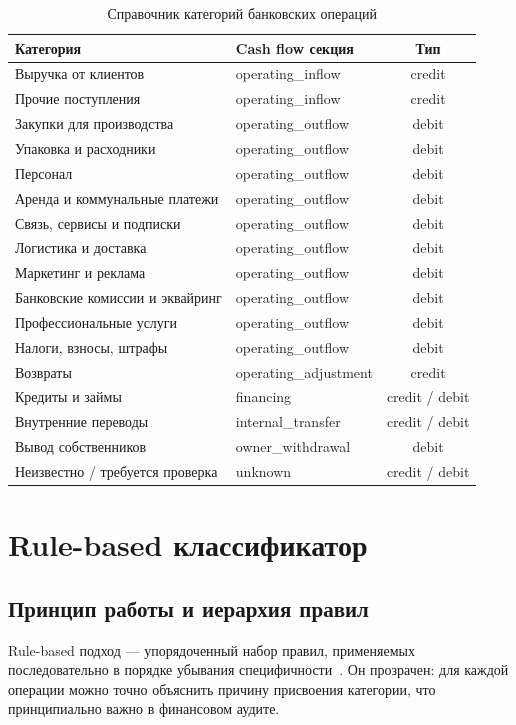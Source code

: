\begin{table}[H]
\centering
\caption{Справочник категорий банковских операций}
\label{tab:categories}
\begin{tabular}{llc}
\toprule
\textbf{Категория} & \textbf{Cash flow секция} & \textbf{Тип} \\
\midrule
Выручка от клиентов & operating\_inflow & credit \\
Прочие поступления & operating\_inflow & credit \\
Закупки для производства & operating\_outflow & debit \\
Упаковка и расходники & operating\_outflow & debit \\
Персонал & operating\_outflow & debit \\
Аренда и коммунальные платежи & operating\_outflow & debit \\
Связь, сервисы и подписки & operating\_outflow & debit \\
Логистика и доставка & operating\_outflow & debit \\
Маркетинг и реклама & operating\_outflow & debit \\
Банковские комиссии и эквайринг & operating\_outflow & debit \\
Профессиональные услуги & operating\_outflow & debit \\
Налоги, взносы, штрафы & operating\_outflow & debit \\
Возвраты & operating\_adjustment & credit \\
Кредиты и займы & financing & credit / debit \\
Внутренние переводы & internal\_transfer & credit / debit \\
Вывод собственников & owner\_withdrawal & debit \\
Неизвестно / требуется проверка & unknown & credit / debit \\
\bottomrule
\end{tabular}
\end{table}

\section{Rule-based классификатор}

\subsection{Принцип работы и иерархия правил}

Rule-based подход --- упорядоченный набор правил, применяемых последовательно в порядке убывания специфичности~\cite{Cohen1995}. Он прозрачен: для каждой операции можно точно объяснить причину присвоения категории, что принципиально важно в финансовом аудите.

